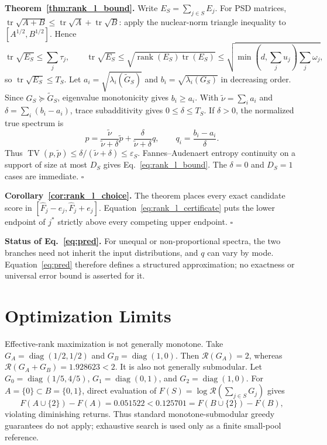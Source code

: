 \documentclass{article}
\begin{document}
\textbf{Theorem~\ref{thm:rank_l_bound}.}
Write $E_S=\sum_{j\in S}E_j$.  For PSD matrices,
$\operatorname{tr}\sqrt{A+B}\leq\operatorname{tr}\sqrt A+
\operatorname{tr}\sqrt B$: apply the nuclear-norm triangle inequality to
$[A^{1/2},B^{1/2}]$.  Hence
\begin{equation}
 \operatorname{tr}\sqrt{E_S}\leq\sum_j\tau_j,
 \qquad
 \operatorname{tr}\sqrt{E_S}
 \leq\sqrt{\operatorname{rank}(E_S)\operatorname{tr}(E_S)}
 \leq\sqrt{\min(d,\sum_j u_j)\sum_j\omega_j},
\end{equation}
so $\operatorname{tr}\sqrt{E_S}\leq T_S$.  Let
$a_i=\sqrt{\lambda_i(\widetilde G_S)}$ and
$b_i=\sqrt{\lambda_i(G_S)}$ in decreasing order.  Since
$G_S\succeq\widetilde G_S$, eigenvalue monotonicity gives $b_i\geq a_i$.
With $\widetilde\nu=\sum_i a_i$ and
$\delta=\sum_i(b_i-a_i)$, trace subadditivity gives $0\leq\delta\leq T_S$.
If $\delta>0$, the normalized true spectrum is
\begin{equation}
 p=\frac{\widetilde\nu}{\widetilde\nu+\delta}\widetilde p
 +\frac{\delta}{\widetilde\nu+\delta}q,
 \qquad q_i=\frac{b_i-a_i}{\delta}.
\end{equation}
Thus $\operatorname{TV}(p,\widetilde p)\leq
\delta/(\widetilde\nu+\delta)\leq\varepsilon_S$.
Fannes--Audenaert entropy continuity on a support of size at most $D_S$
gives Eq.~\eqref{eq:rank_l_bound}.  The $\delta=0$ and $D_S=1$ cases are
immediate. $\square$

\textbf{Corollary~\ref{cor:rank_l_choice}.}
The theorem places every exact candidate score in
$[\widehat F_j-e_j,\widehat F_j+e_j]$.  Equation~\eqref{eq:rank_l_certificate}
puts the lower endpoint of $j^*$ strictly above every competing upper
endpoint. $\square$

\textbf{Status of Eq.~\eqref{eq:pred}.}
For unequal or non-proportional spectra, the two branches need not inherit
the input distributions, and $q$ can vary by mode.  Equation~\eqref{eq:pred}
therefore defines a structured approximation; no exactness or universal
error bound is asserted for it.

\section{Optimization Limits}
\label{app:optimization_limits}

Effective-rank maximization is not generally monotone.  Take
$G_A=\operatorname{diag}(1/2,1/2)$ and
$G_B=\operatorname{diag}(1,0)$.  Then $\mathcal R(G_A)=2$, whereas
$\mathcal R(G_A+G_B)=1.928623<2$.  It is also not generally submodular.
Let $G_0=\operatorname{diag}(1/5,4/5)$,
$G_1=\operatorname{diag}(0,1)$, and
$G_2=\operatorname{diag}(1,0)$.  For
$A=\{0\}\subset B=\{0,1\}$, direct evaluation of
$F(S)=\log\mathcal R(\sum_{j\in S}G_j)$ gives
\begin{equation}
 F(A\cup\{2\})-F(A)=0.051522
 <0.125701=F(B\cup\{2\})-F(B),
\end{equation}
violating diminishing returns.
Thus standard monotone-submodular greedy guarantees do not apply; exhaustive
search is used only as a finite small-pool reference.
\end{document}
